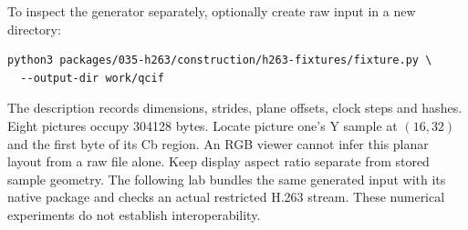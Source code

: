 To inspect the generator separately, optionally create raw input in a new directory:
\begin{Verbatim}
python3 packages/035-h263/construction/h263-fixtures/fixture.py \
  --output-dir work/qcif
\end{Verbatim}
The description records dimensions, strides, plane offsets, clock steps and hashes.
Eight pictures occupy 304128 bytes. Locate picture one's Y sample at $(16,32)$
and the first byte of its Cb region. An RGB viewer cannot infer this planar layout
from a raw file alone. Keep display aspect ratio separate from stored sample
geometry. The following lab bundles the same generated input with its native
package and checks an actual restricted H.263 stream. These numerical experiments
do not establish interoperability.
